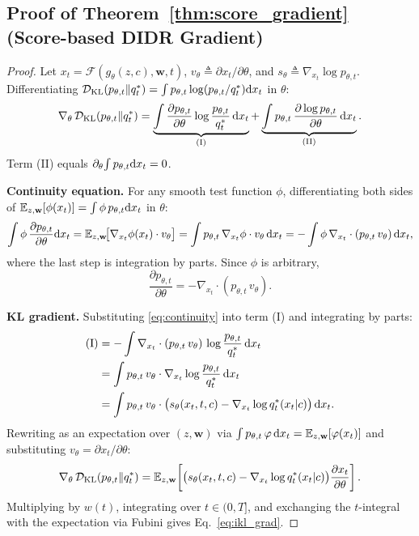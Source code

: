 \subsection{Proof of Theorem~\ref{thm:score_gradient} (Score-based DIDR Gradient)}
\label{app:proof_thm2}
\begin{proof}
Let $x_t = \mathcal{F}(g_\theta(z,c),\mathbf{w},t)$, $v_\theta\triangleq\partial x_t/\partial\theta$, and $s_\theta\triangleq\nabla_{x_t}\log p_{\theta,t}$. Differentiating $\mathcal{D}_{\mathrm{KL}}(p_{\theta,t}\|q_t^*)=\int p_{\theta,t}\log(p_{\theta,t}/q_t^*)\mathrm{d} x_t$ in $\theta$:
\begin{equation}
\nabla_\theta\,\mathcal{D}_{\mathrm{KL}}(p_{\theta,t}\|q_t^*)
= \underbrace{\int\frac{\partial p_{\theta,t}}{\partial\theta}\log\frac{p_{\theta,t}}{q_t^*}\,\mathrm{d} x_t}_{\mathrm{(I)}}
+ \underbrace{\int p_{\theta,t}\,\frac{\partial\log p_{\theta,t}}{\partial\theta}\,\mathrm{d} x_t}_{\mathrm{(II)}}.
\end{equation}
Term (II) equals $\partial_\theta\!\int p_{\theta,t}\mathrm{d} x_t = 0$.

\textbf{Continuity equation.} For any smooth test function $\phi$, differentiating both sides of $\mathbb{E}_{z,\mathbf{w}}[\phi(x_t)]=\int\phi\,p_{\theta,t}\mathrm{d} x_t$ in $\theta$:
\begin{equation}
\int\phi\,\frac{\partial p_{\theta,t}}{\partial\theta}\mathrm{d} x_t
= \mathbb{E}_{z,\mathbf{w}}\!\bigl[\nabla_{x_t}\phi(x_t)\cdot v_\theta\bigr]
= \int p_{\theta,t}\,\nabla_{x_t}\phi\cdot v_\theta\,\mathrm{d} x_t
= -\int\phi\,\nabla_{x_t}\cdot(p_{\theta,t}\,v_\theta)\,\mathrm{d} x_t,
\end{equation}
where the last step is integration by parts. Since $\phi$ is arbitrary,
\begin{equation}
\label{eq:continuity}
\frac{\partial p_{\theta,t}}{\partial\theta} = -\nabla_{x_t}\cdot(p_{\theta,t}\,v_\theta).
\end{equation}

\textbf{KL gradient.} Substituting \eqref{eq:continuity} into term (I) and integrating by parts:
\begin{align}
\mathrm{(I)}
&= -\int\nabla_{x_t}\cdot(p_{\theta,t}\,v_\theta)\,\log\frac{p_{\theta,t}}{q_t^*}\,\mathrm{d} x_t \nonumber\\
&= \int p_{\theta,t}\,v_\theta\cdot\nabla_{x_t}\log\frac{p_{\theta,t}}{q_t^*}\,\mathrm{d} x_t \nonumber\\
&= \int p_{\theta,t}\,v_\theta\cdot\bigl(s_\theta(x_t,t,c) - \nabla_{x_t}\log q_t^*(x_t|c)\bigr)\,\mathrm{d} x_t.
\end{align}
Rewriting as an expectation over $(z,\mathbf{w})$ via $\int p_{\theta,t}\,\varphi\,\mathrm{d} x_t = \mathbb{E}_{z,\mathbf{w}}[\varphi(x_t)]$ and substituting $v_\theta = \partial x_t/\partial\theta$:
\begin{equation}
\nabla_\theta\,\mathcal{D}_{\mathrm{KL}}(p_{\theta,t}\|q_t^*) = \mathbb{E}_{z,\mathbf{w}}\!\left[\bigl(s_\theta(x_t,t,c)-\nabla_{x_t}\log q_t^*(x_t|c)\bigr)\frac{\partial x_t}{\partial\theta}\right].
\end{equation}
Multiplying by $w(t)$, integrating over $t\in(0,T]$, and exchanging the $t$-integral with the expectation via Fubini gives Eq.~\eqref{eq:ikl_grad}.


\end{proof}
